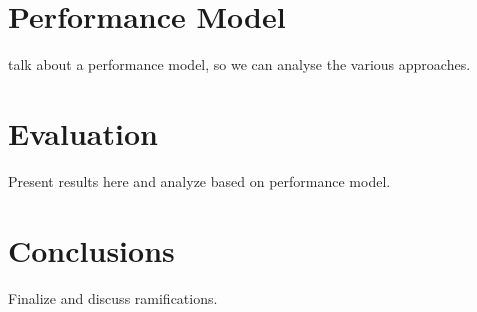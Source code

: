 \documentclass[times]{nlaauth}
\begin{document}
\section{Performance Model}

talk about a performance model, so we can analyse the various approaches.

\section{Evaluation}

Present results here and analyze based on performance model.



\section{Conclusions}

Finalize and discuss ramifications.




\end{document}
